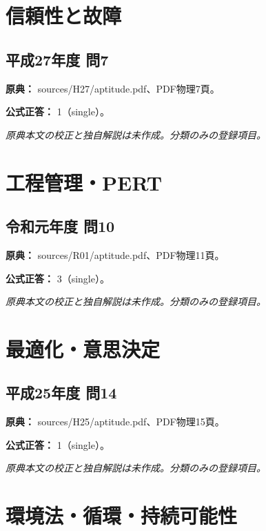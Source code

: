 \section{信頼性と故障}

\subsection{平成27年度 問7}
\label{q:h27-reg-apt-07}

\noindent\textbf{原典：} sources/H27/aptitude.pdf、PDF物理7頁。

\textbf{公式正答：} 1（single）。

\par\textit{原典本文の校正と独自解説は未作成。分類のみの登録項目。}

\section{工程管理・PERT}

\subsection{令和元年度 問10}
\label{q:r01-reg-apt-10}

\noindent\textbf{原典：} sources/R01/aptitude.pdf、PDF物理11頁。

\textbf{公式正答：} 3（single）。

\par\textit{原典本文の校正と独自解説は未作成。分類のみの登録項目。}

\section{最適化・意思決定}

\subsection{平成25年度 問14}
\label{q:h25-reg-apt-14}

\noindent\textbf{原典：} sources/H25/aptitude.pdf、PDF物理15頁。

\textbf{公式正答：} 1（single）。

\par\textit{原典本文の校正と独自解説は未作成。分類のみの登録項目。}

\section{環境法・循環・持続可能性}


